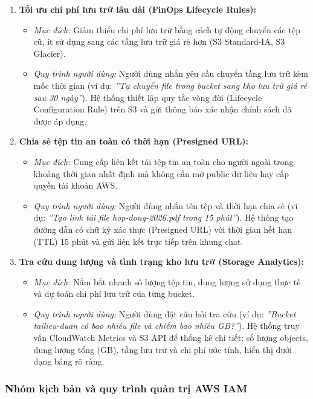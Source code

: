 \documentclass[a4paper,12pt]{article}
\begin{document}
\begin{enumerate}
  \item \textbf{Tối ưu chi phí lưu trữ lâu dài (FinOps Lifecycle Rules):}
  \begin{itemize}
    \item \textit{Mục đích:} Giảm thiểu chi phí lưu trữ bằng cách tự động chuyển các tệp cũ, ít sử dụng sang các tầng lưu trữ giá rẻ hơn (S3 Standard-IA, S3 Glacier).
    \item \textit{Quy trình người dùng:} Người dùng nhắn yêu cầu chuyển tầng lưu trữ kèm mốc thời gian (ví dụ: \textit{''Tự chuyển file trong bucket sang kho lưu trữ giá rẻ sau 30 ngày''}). Hệ thống thiết lập quy tắc vòng đời (Lifecycle Configuration Rule) trên S3 và gửi thông báo xác nhận chính sách đã được áp dụng.
  \end{itemize}

  \item \textbf{Chia sẻ tệp tin an toàn có thời hạn (Presigned URL):}
  \begin{itemize}
    \item \textit{Mục đích:} Cung cấp liên kết tải tệp tin an toàn cho người ngoài trong khoảng thời gian nhất định mà không cần mở public dữ liệu hay cấp quyền tài khoản AWS.
    \item \textit{Quy trình người dùng:} Người dùng nhắn tên tệp và thời hạn chia sẻ (ví dụ: \textit{''Tạo link tải file hop-dong-2026.pdf trong 15 phút''}). Hệ thống tạo đường dẫn có chữ ký xác thực (Presigned URL) với thời gian hết hạn (TTL) 15 phút và gửi liên kết trực tiếp trên khung chat.
  \end{itemize}

  \item \textbf{Tra cứu dung lượng và tình trạng kho lưu trữ (Storage Analytics):}
  \begin{itemize}
    \item \textit{Mục đích:} Nắm bắt nhanh số lượng tệp tin, dung lượng sử dụng thực tế và dự toán chi phí lưu trữ của từng bucket.
    \item \textit{Quy trình người dùng:} Người dùng đặt câu hỏi tra cứu (ví dụ: \textit{''Bucket tailieu-duan có bao nhiêu file và chiếm bao nhiêu GB?''}). Hệ thống truy vấn CloudWatch Metrics và S3 API để thống kê chi tiết: số lượng objects, dung lượng tổng (GB), tầng lưu trữ và chi phí ước tính, hiển thị dưới dạng bảng rõ ràng.
  \end{itemize}
\end{enumerate}

\subsubsection{Nhóm kịch bản và quy trình quản trị AWS IAM}
\end{document}
